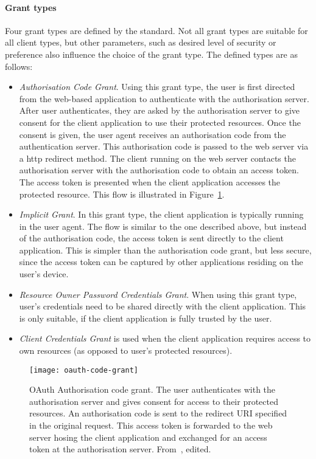 \paragraph{Grant types} Four grant types are defined by the standard. Not all grant types are suitable for all client types, but other parameters, such as desired level of security or preference also influence the choice of the grant type. The defined types are as follows:

\begin{itemize}[noitemsep]
    \item \textit{Authorisation Code Grant}. Using this grant type, the user is first directed from the web-based application to authenticate with the authorisation server. After user authenticates, they are asked by the authorisation server to give consent for the client application to use their protected resources. Once the consent is given, the user agent receives an authorisation code from the authentication server. This authorisation code is passed to the web server via a \acrshort{http} redirect method. The client running on the web server contacts the authorisation server with the authorisation code to obtain an access token. The access token is presented when the client application accesses the protected resource. This flow is illustrated in Figure~\ref{fig:oauth-code-grant}.
    \item \textit{Implicit Grant}. In this grant type, the client application is typically running in the user agent. The flow is similar to the one described above, but instead of the authorisation code, the access token is sent directly to the client application. This is simpler than the authorisation code grant, but less secure, since the access token can be captured by other applications residing on the user's device.
    \item \textit{Resource Owner Password Credentials Grant}. When using this grant type, user's credentials need to be shared directly with the client application. This is only suitable, if the client application is fully trusted by the user.
    \item \textit{Client Credentials Grant} is used when the client application requires access to own resources (as opposed to user's protected resources).
\end{itemize}

\begin{figure}[ht]
    \centering
    \texttt{[image: oauth-code-grant]}
    \caption{OAuth Authorisation code grant. The user authenticates with the authorisation server and gives consent for access to their protected resources. An authorisation code is sent to the redirect URI specified in the original request. This access token is forwarded to the web server hosing the client application and exchanged for an access token at the authorisation server. From~\cite{Hardt2012TheFramework}, edited.}
    \label{fig:oauth-code-grant}
\end{figure}

